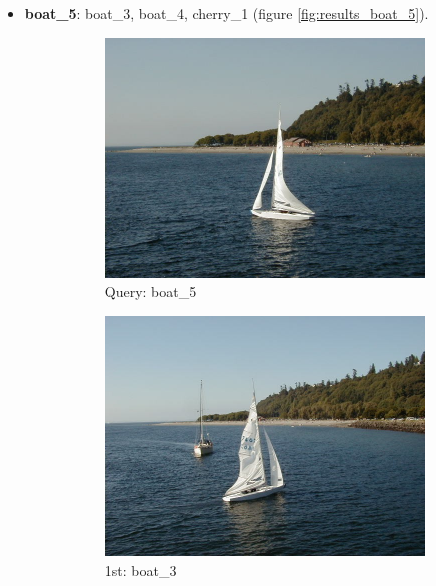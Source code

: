 \begin{itemize}
\item \textbf{boat\_5}: boat\_3, boat\_4, cherry\_1 (figure \ref{fig:results_boat_5}).
\begin{figure}[H]
	\centering
	\begin{subfigure}{0.25\textwidth}
	  \centering
	  \includegraphics[width=0.9\linewidth]{../input/boat_5.jpg}
	  \caption{Query: boat\_5}
	\end{subfigure}%
	\begin{subfigure}{0.25\textwidth}
	  \centering
	  \includegraphics[width=0.9\linewidth]{../input/boat_3.jpg}
	  \caption{1st: boat\_3}
	\end{subfigure}%
	\begin{subfigure}{0.25\textwidth}
        \centering

\end{subfigure}
\end{figure}
\end{itemize}
